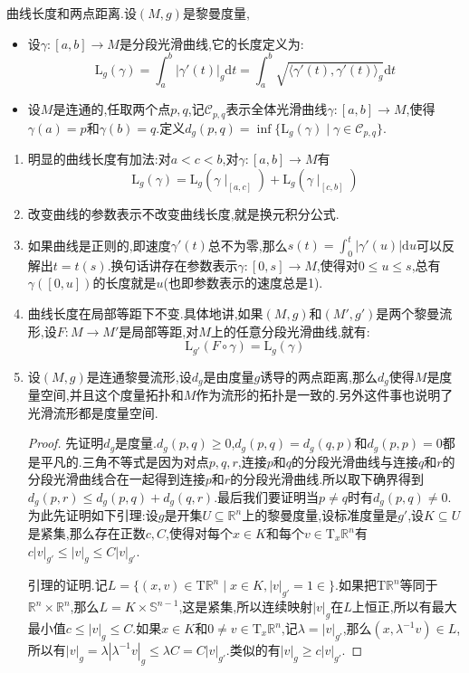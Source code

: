 曲线长度和两点距离.设$(M,g)$是黎曼度量,
\begin{itemize}
	\item 设$\gamma:[a,b]\to M$是分段光滑曲线,它的长度定义为:
	$$\mathrm{L}_g(\gamma)=\int_a^b|\gamma'(t)|_g\mathrm{d}t=\int_a^b\sqrt{\langle\gamma'(t),\gamma'(t)\rangle_g}\mathrm{d}t$$
	\item 设$M$是连通的,任取两个点$p,q$,记$\mathscr{C}_{p,q}$表示全体光滑曲线$\gamma:[a,b]\to M$,使得$\gamma(a)=p$和$\gamma(b)=q$.定义$d_g(p,q)=\inf\{\mathrm{L}_g(\gamma)\mid\gamma\in\mathscr{C}_{p,q}\}$.
\end{itemize}
\begin{enumerate}
	\item 明显的曲线长度有加法:对$a<c<b$,对$\gamma:[a,b]\to M$有
	$$\mathrm{L}_g(\gamma)=\mathrm{L}_g(\gamma\mid_{[a,c]})+\mathrm{L}_g(\gamma\mid_{[c,b]})$$
	\item 改变曲线的参数表示不改变曲线长度,就是换元积分公式.
	\item 如果曲线是正则的,即速度$\gamma'(t)$总不为零,那么$s(t)=\int_0^t|\gamma'(u)|\mathrm{d}u$可以反解出$t=t(s)$.换句话讲存在参数表示$\gamma:[0,s]\to M$,使得对$0\le u\le s$,总有$\gamma([0,u])$的长度就是$u$(也即参数表示的速度总是1).
	\item 曲线长度在局部等距下不变.具体地讲,如果$(M,g)$和$(M',g')$是两个黎曼流形,设$F:M\to M'$是局部等距,对$M$上的任意分段光滑曲线,就有:
	$$\mathrm{L}_{g'}(F\circ\gamma)=\mathrm{L}_g(\gamma)$$
	\item 设$(M,g)$是连通黎曼流形,设$d_g$是由度量$g$诱导的两点距离,那么$d_g$使得$M$是度量空间,并且这个度量拓扑和$M$作为流形的拓扑是一致的.另外这件事也说明了光滑流形都是度量空间.
	\begin{proof}
		
		先证明$d_g$是度量.$d_g(p,q)\ge0$,$d_g(p,q)=d_g(q,p)$和$d_g(p,p)=0$都是平凡的.三角不等式是因为对点$p,q,r$,连接$p$和$q$的分段光滑曲线与连接$q$和$r$的分段光滑曲线合在一起得到连接$p$和$r$的分段光滑曲线.所以取下确界得到$d_g(p,r)\le d_g(p,q)+d_g(q,r)$.最后我们要证明当$p\not=q$时有$d_g(p,q)\not=0$.为此先证明如下引理:设$g$是开集$U\subseteq\mathbb{R}^n$上的黎曼度量,设标准度量是$g'$,设$K\subseteq U$是紧集,那么存在正数$c,C$,使得对每个$x\in K$和每个$v\in\mathrm{T}_x\mathbb{R}^n$有$c|v|_{g'}\le|v|_g\le C|v|_{g'}$.
		
		\qquad
		
		引理的证明.记$L=\{(x,v)\in\mathrm{T}\mathbb{R}^n\mid x\in K,|v|_{g'}=1\in\}$.如果把$\mathrm{T}\mathbb{R}^n$等同于$\mathbb{R}^n\times\mathbb{R}^n$,那么$L=K\times\mathbb{S}^{n-1}$,这是紧集,所以连续映射$|v|_g$在$L$上恒正,所以有最大最小值$c\le|v|_g\le C$.如果$x\in K$和$0\not=v\in\mathrm{T}_x\mathbb{R}^n$,记$\lambda=|v|_{g'}$,那么$(x,\lambda^{-1}v)\in L$,所以有$|v|_g=\lambda|\lambda^{-1}v|_g\le\lambda C=C|v|_{g'}$.类似的有$|v|_g\ge c|v|_{g'}$.
		

\end{proof}
\end{enumerate}

